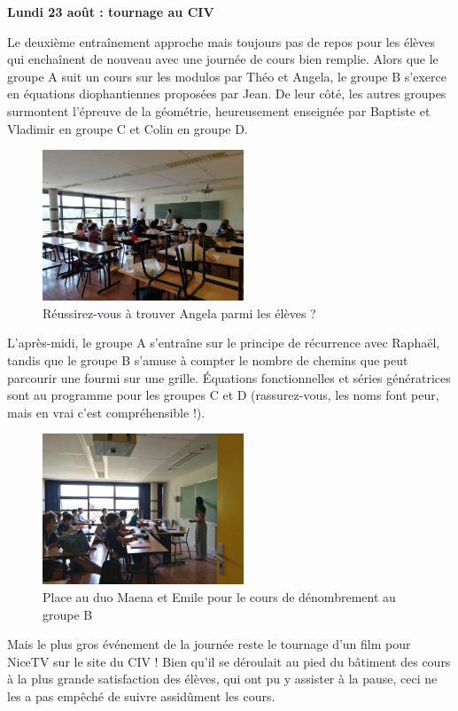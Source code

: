 \begin{center}
{\textbf{Lundi 23 août : tournage au CIV}}
\end{center}
\vspace{2mm}

Le deuxième entraînement approche mais toujours pas de repos pour les élèves qui enchaînent de nouveau avec une journée de cours bien remplie. Alors que le groupe A suit un cours sur les modulos par Théo et Angela, le groupe B s’exerce en équations diophantiennes proposées par Jean. De leur côté, les autres groupes surmontent l’épreuve de la géométrie, heureusement enseignée par Baptiste et Vladimir en groupe C et Colin en groupe D.

\begin{figure}[H]
\centering\includegraphics[width=6cm]{CR-23-0.jpg}
\caption{Réussirez-vous à trouver Angela parmi les élèves ?}
\end{figure}

L’après-midi, le groupe A s’entraîne sur le principe de récurrence avec Raphaël, tandis que le groupe B s’amuse à compter le nombre de chemins que peut parcourir une fourmi sur une grille. Équations fonctionnelles et séries génératrices sont au programme pour les groupes C et D (rassurez-vous, les noms font peur, mais en vrai c’est compréhensible !).

\begin{figure}[H]
\centering\includegraphics[width=6cm]{CR-23-1.jpg}
\caption{Place au duo Maena et Emile pour le cours de dénombrement au groupe B}
\end{figure}

Mais le plus gros événement de la journée reste le tournage d’un film pour NiceTV sur le site du CIV ! Bien qu’il se déroulait au pied du bâtiment des cours à la plus grande satisfaction des élèves, qui ont pu y assister à la pause, ceci ne les a pas empêché de suivre assidûment les cours.

